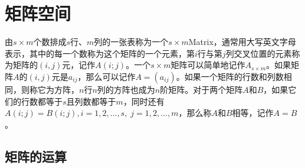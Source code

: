 \section{矩阵空间}

\begin{definition}
	由$s\times m$个数排成$s$行、$m$列的一张表称为一个$s\times m$\gls{Matrix}，通常用大写英文字母表示，其中的每一个数称为这个矩阵的一个元素，第$i$行与第$j$列交叉位置的元素称为矩阵的$(i,j)$元，记作$A(i;j)$。一个$s\times m$矩阵可以简单地记作$A_{s\times m}$。如果矩阵$A$的$(i,j)$元是$a_{ij}$，那么可以记作$A=(a_{ij})$。如果一个矩阵的行数和列数相同，则称它为方阵，$n$行$n$列的方阵也成为$n$阶矩阵。对于两个矩阵$A$和$B$，如果它们的行数都等于$s$且列数都等于$m$，同时还有$A(i;j)=B(i;j),i=1,2,\dots,s,\;j=1,2,\dots,m$，那么称$A$和$B$相等，记作$A=B$。
\end{definition}

\subsection{矩阵的运算}
